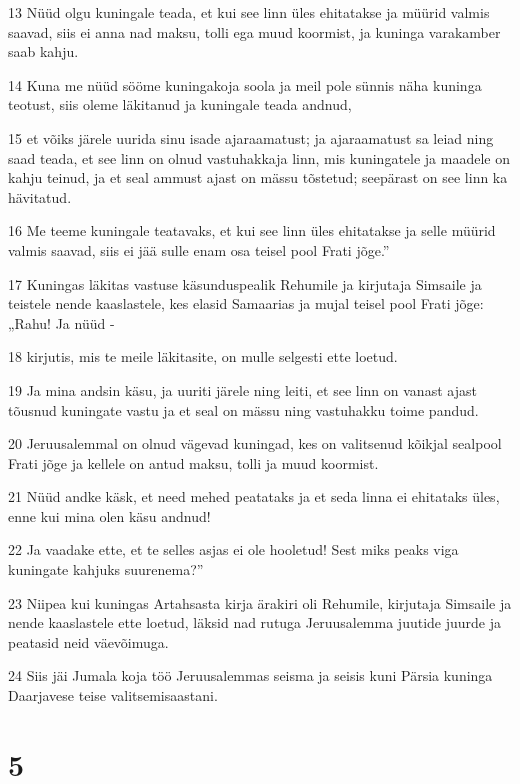 \par 13 Nüüd olgu kuningale teada, et kui see linn üles ehitatakse ja müürid valmis saavad, siis ei anna nad maksu, tolli ega muud koormist, ja kuninga varakamber saab kahju.
\par 14 Kuna me nüüd sööme kuningakoja soola ja meil pole sünnis näha kuninga teotust, siis oleme läkitanud ja kuningale teada andnud,
\par 15 et võiks järele uurida sinu isade ajaraamatust; ja ajaraamatust sa leiad ning saad teada, et see linn on olnud vastuhakkaja linn, mis kuningatele ja maadele on kahju teinud, ja et seal ammust ajast on mässu tõstetud; seepärast on see linn ka hävitatud.
\par 16 Me teeme kuningale teatavaks, et kui see linn üles ehitatakse ja selle müürid valmis saavad, siis ei jää sulle enam osa teisel pool Frati jõge.”
\par 17 Kuningas läkitas vastuse käsunduspealik Rehumile ja kirjutaja Simsaile ja teistele nende kaaslastele, kes elasid Samaarias ja mujal teisel pool Frati jõge: „Rahu! Ja nüüd -
\par 18 kirjutis, mis te meile läkitasite, on mulle selgesti ette loetud.
\par 19 Ja mina andsin käsu, ja uuriti järele ning leiti, et see linn on vanast ajast tõusnud kuningate vastu ja et seal on mässu ning vastuhakku toime pandud.
\par 20 Jeruusalemmal on olnud vägevad kuningad, kes on valitsenud kõikjal sealpool Frati jõge ja kellele on antud maksu, tolli ja muud koormist.
\par 21 Nüüd andke käsk, et need mehed peatataks ja et seda linna ei ehitataks üles, enne kui mina olen käsu andnud!
\par 22 Ja vaadake ette, et te selles asjas ei ole hooletud! Sest miks peaks viga kuningate kahjuks suurenema?”
\par 23 Niipea kui kuningas Artahsasta kirja ärakiri oli Rehumile, kirjutaja Simsaile ja nende kaaslastele ette loetud, läksid nad rutuga Jeruusalemma juutide juurde ja peatasid neid väevõimuga.
\par 24 Siis jäi Jumala koja töö Jeruusalemmas seisma ja seisis kuni Pärsia kuninga Daarjavese teise valitsemisaastani.

\chapter{5}

